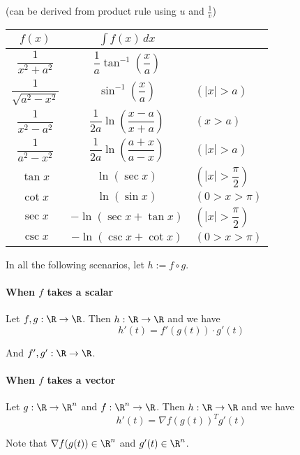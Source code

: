 (can be derived from product rule using $u$ and $\frac1v$)

\begin{center}
	\renewcommand{\arraystretch}{2.1}\def\d{\displaystyle}
	\begin{tabular}{c|c l}
		$f(x)$                    & $\int f(x)\,dx$                               &                    \\\hline
		$\dfrac1{x^2+a^2}$        & $\dfrac1a\tan^{-1}\left(\dfrac xa\right)$     &                    \\
		$\dfrac1{\sqrt{a^2-x^2}}$ & $\sin^{-1}\left(\dfrac xa\right)$             & $(|x|>a)$          \\
		$\dfrac1{x^2-a^2}$        & $\dfrac1{2a}\ln\left(\dfrac{x-a}{x+a}\right)$ & $(x>a)$            \\
		$\dfrac1{a^2-x^2}$        & $\dfrac1{2a}\ln\left(\dfrac{a+x}{a-x}\right)$ & $(|x|>a)$          \\
		$\tan x$                  & $\ln(\sec x)$                                 & $(|x|>\dfrac\pi2)$ \\
		$\cot x$                  & $\ln(\sin x)$                                 & $(0>x>\pi)$        \\
		$\sec x$                  & $-\ln(\sec x+\tan x)$                         & $(|x|>\dfrac\pi2)$ \\
		$\csc x$                  & $-\ln(\csc x+\cot x)$                         & $(0>x>\pi)$
	\end{tabular}
\end{center}

\label{d969d46}

In all the following scenarios, let $h:=f\circ g$.

\paragraph{When $f$ takes a scalar} Let $f,g:\R\to\R$. Then
$h:\R\to\R$ and we have
$$h'(t)=f'(g(t))\cdot g'(t)$$

And $f',g':\R\to\R$.

\paragraph{When $f$ takes a vector} Let $g:\R\to\R^n$ and
$f:\R^n\to\R$. Then $h:\R\to\R$ and we have
$$h'(t)=\nabla f(g(t))^Tg'(t)$$

Note that $\nabla f(g(t))\in\R^n$ and $g'(t)\in\R^n$.

